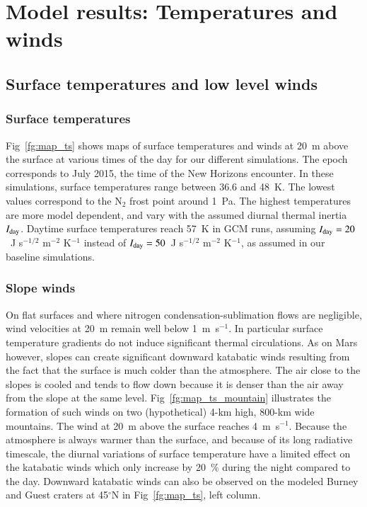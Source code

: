 \section{Model results: Temperatures and winds}
\label{sc:Tresults}


\subsection{Surface temperatures and low level winds}

\subsubsection{Surface temperatures}
Fig~\ref{fg:map_ts} shows maps of surface temperatures and winds at 20~m above the surface at
various times of the day for our different simulations. The epoch corresponds 
to July 2015, the time of the New
Horizons encounter. In these simulations, surface temperatures range between 36.6 and 48~K. The
lowest values correspond to the N$_2$ frost point around 1~Pa. The highest temperatures are more
model dependent, and vary with the assumed diurnal thermal inertia
$I_{\mbox{\scriptsize day}}$.
Daytime surface temperatures
reach 57~K in GCM runs, assuming 
$I_{\mbox{\scriptsize day}}=20$~J s$^{-1/2}$ m$^{-2}$ K$^{-1}$ \citep[as reported by][]{Lell:11spitzer} 
instead of 
$I_{\mbox{\scriptsize day}}=50$~J s$^{-1/2}$ m$^{-2}$ K$^{-1}$, as assumed
in our baseline simulations.

\subsubsection{Slope winds}

On flat surfaces and where nitrogen condensation-sublimation flows are  negligible, 
wind velocities at 20~m remain well below 1~m~s$^{-1}$. In particular surface temperature gradients do
not induce significant thermal circulations.
As on Mars however, slopes can create significant downward katabatic winds resulting from the fact
that the surface is much 
colder than the atmosphere. The air close to the slopes is cooled and
tends to flow down because it is denser than the air away from the slope at the same level. 
Fig~\ref{fg:map_ts_mountain} illustrates the formation of such winds on two (hypothetical) 4-km
high, 800-km wide mountains. The wind at 20~m above the surface reaches 4~m~s$^{-1}$.
Because the atmosphere is always warmer than the surface, and because of its long radiative
timescale, the diurnal variations of surface temperature have a 
limited effect on the katabatic winds  which only increase by 20~\% during the night compared to
the day. Downward katabatic winds can also be observed on the modeled
Burney and Guest craters at 45$^\circ$N in Fig~\ref{fg:map_ts}, left column.

